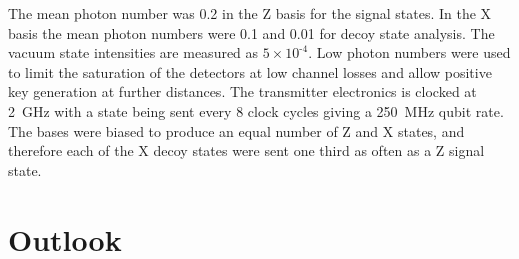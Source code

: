The mean photon number was 0.2 in the Z basis for the signal states. In the X basis the mean photon numbers were 0.1 and 0.01 for decoy state analysis. The vacuum state intensities are measured as $\text{5}\times \text{10}^\text{-4}$. Low photon numbers were used to limit the saturation of the detectors at low channel losses and allow positive key generation at further distances. The transmitter electronics is clocked at \SI{2}{GHz} with a state being sent every 8 clock cycles giving a \SI{250}{MHz} qubit rate. The bases were biased to produce an equal number of Z and X states, and therefore each of the X decoy states were sent one third as often as a Z signal state.

%
%

%


\section{Outlook}

